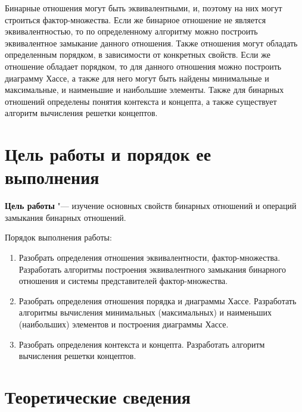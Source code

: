 \documentclass[bachelor, och, labwork]{shiza}
\begin{document}



\tableofcontents

\intro

Бинарные отношения могут быть эквивалентными, и, поэтому на них могут строиться
фактор-множества. Если же бинарное отношение не является эквивалентностью, то
по определенному алгоритму можно построить эквивалентное замыкание данного
отношения. Также отношения могут обладать определенным порядком, в зависимости
от конкретных свойств. Если же отношение обладает порядком, то для данного
отношения можно построить диаграмму Хассе, а также для него могут быть
найдены минимальные и максимальные, и наименьшие и наибольшие элементы.
Также для бинарных отношений определены понятия контекста и концепта, а также
существует алгоритм вычисления решетки концептов.

\section{\textbf{Цель работы и порядок ее выполнения}}

\textbf{Цель работы} "--- изучение основных свойств бинарных отношений и 
операций замыкания бинарных отношений.

Порядок выполнения работы:

\begin{enumerate}

    \item Разобрать определения отношения эквивалентности, фактор-множества. 
    Разработать алгоритмы построения эквивалентного замыкания бинарного отношения 
    и системы представителей фактор-множества.  

    \item Разобрать определения отношения порядка и диаграммы Хассе. Разработать 
    алгоритмы вычисления минимальных (максимальных) и наименьших (наибольших) 
    элементов  и построения диаграммы Хассе. 

    \item Разобрать определения контекста и концепта. Разработать алгоритм 
    вычисления решетки концептов.

\end{enumerate}

\section{Теоретические сведения}
\end{document}
